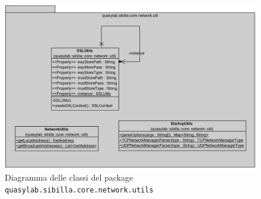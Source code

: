 \begin{figure}[H]
    \includegraphics[width=\linewidth]{images/quasylab.sibilla.core.network.utils.png}
    \captionsetup{justification=centering}
    \caption{Diagramma delle classi del package \texttt{quasylab.sibilla.core.network.utils}}
  \end{figure}














